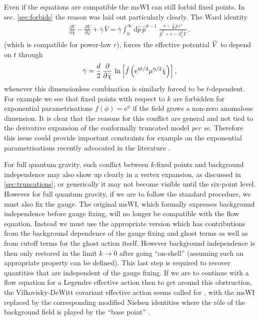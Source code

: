\documentclass[11pt]{book} %
\newcommand{\overbar}[1]{\mkern 1.5mu\overline{\mkern-1.5mu#1\mkern-1.5mu}\mkern 1.5mu}
\newcommand{\bV}{\overbar V}
\newcommand{\bc}{\bar \chi}
\numberwithin{equation}{chapter}
\begin{document}
Even if the equations are compatible the msWI can still forbid fixed points.
In sec. \ref{sec:forbids} the reason was laid out particularly clearly. The Ward identity
\begin{align}
  \frac{\partial \bar V}{\partial \bar\chi} - \frac{\partial \bar V}{\partial \bar\varphi} + \bar \gamma \, \bar V = \bar \gamma
  \int_0^{\infty} \mathrm d\hat p \, \hat p^{d-1} \; \frac{r - \frac{1}{d} \, \hat p \, r'}{\hat p^2 + r - \partial^2_{\bar\varphi}\bar V} \,,
\end{align}
(which is compatible for power-law $r$),
forces the effective potential $\bV$ to depend on $t$ through
\begin{align}
  \bar{\gamma} = \frac{d}{2} \, \frac{\partial}{\partial\bc} \,
  \ln \left[ \bar{f} \left({\rm e}^{\eta t/2}\mu^{\eta/2}\bc \right) \right] ,
\end{align}
whenever this dimensionless combination is similarly forced to be $t$-dependent.
For example we see that fixed points with respect to $k$ are forbidden for exponential parametrisations
$f(\phi) = \mathrm e ^ \phi$  if the field grows a non-zero anomalous dimension.
It is clear that the reasons for this conflict are general and not tied to the derivative expansion
of the conformally truncated model \textit{per se}.
Therefore this issue could provide important constraints for example on the exponential parametrisations
recently advocated in the literature
\cite{Demmel:2015zfa,Eichhorn:2013xr,Eichhorn:2015bna,Nink:2014yya,Percacci:2015wwa,
Ohta:2015efa,Gies:2015tca}.

For full quantum gravity, such conflict between $k$-fixed points and background independence may also
show up clearly in a vertex expansion, as discussed in \ref{sec:truncations},
or generically it may not become visible until the six-point level.
However for full quantum gravity, if we are to follow the standard procedure, we must also fix the gauge.
The original msWI, which formally expresses background independence before gauge fixing,
will no longer be compatible with the flow equation.
Instead we must use the appropriate version which has contributions from the background dependence of
the gauge fixing and ghost terms as well as from cutoff terms for the ghost action itself.
However background independence is then only restored in the limit $k\to0$ after going ``on-shell''
(assuming such an appropriate property can be defined).
This last step is required to recover quantities that are independent of the gauge fixing.
If we are to continue with a flow equation for a Legendre effective action
\cite{Wetterich:1992yh,Morris:1993qb} then to get around this obstruction,
the Vilkovisky-DeWitt covariant effective action seems called for
\cite{Branchina:2003ek,Donkin:2012ud,Demmel:2014hla,Safari:2015dva},
with the msWI replaced by the corresponding modified Nielsen identities where the r\^ole of the background
field is played by the ``base point'' \cite{Pawlowski:2003sk}.
\end{document}
